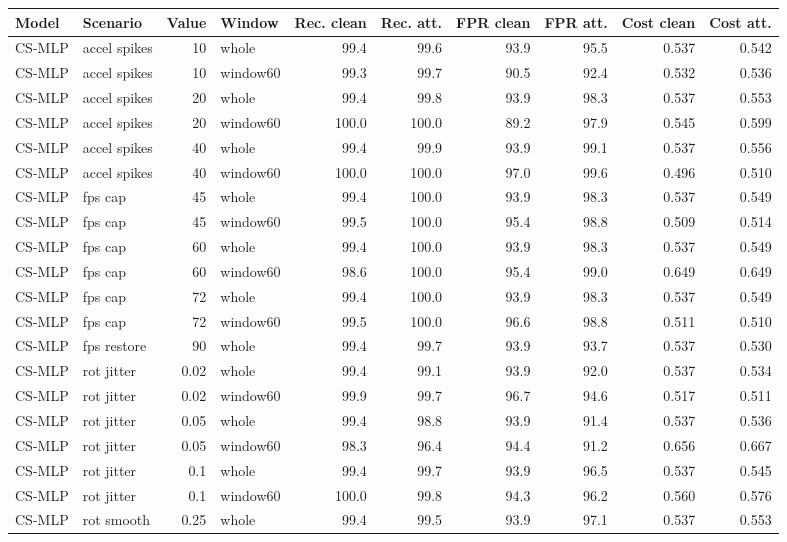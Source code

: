 \begin{longtable}{llrlrrrrrr}
\toprule
Model & Scenario & Value & Window & Rec. clean & Rec. att. & FPR clean & FPR att. & Cost clean & Cost att. \\
\midrule
\endhead
CS-MLP & accel spikes & 10 & whole & 99.4 & 99.6 & 93.9 & 95.5 & 0.537 & 0.542 \\
CS-MLP & accel spikes & 10 & window60 & 99.3 & 99.7 & 90.5 & 92.4 & 0.532 & 0.536 \\
CS-MLP & accel spikes & 20 & whole & 99.4 & 99.8 & 93.9 & 98.3 & 0.537 & 0.553 \\
CS-MLP & accel spikes & 20 & window60 & 100.0 & 100.0 & 89.2 & 97.9 & 0.545 & 0.599 \\
CS-MLP & accel spikes & 40 & whole & 99.4 & 99.9 & 93.9 & 99.1 & 0.537 & 0.556 \\
CS-MLP & accel spikes & 40 & window60 & 100.0 & 100.0 & 97.0 & 99.6 & 0.496 & 0.510 \\
CS-MLP & fps cap & 45 & whole & 99.4 & 100.0 & 93.9 & 98.3 & 0.537 & 0.549 \\
CS-MLP & fps cap & 45 & window60 & 99.5 & 100.0 & 95.4 & 98.8 & 0.509 & 0.514 \\
CS-MLP & fps cap & 60 & whole & 99.4 & 100.0 & 93.9 & 98.3 & 0.537 & 0.549 \\
CS-MLP & fps cap & 60 & window60 & 98.6 & 100.0 & 95.4 & 99.0 & 0.649 & 0.649 \\
CS-MLP & fps cap & 72 & whole & 99.4 & 100.0 & 93.9 & 98.3 & 0.537 & 0.549 \\
CS-MLP & fps cap & 72 & window60 & 99.5 & 100.0 & 96.6 & 98.8 & 0.511 & 0.510 \\
CS-MLP & fps restore & 90 & whole & 99.4 & 99.7 & 93.9 & 93.7 & 0.537 & 0.530 \\
CS-MLP & rot jitter & 0.02 & whole & 99.4 & 99.1 & 93.9 & 92.0 & 0.537 & 0.534 \\
CS-MLP & rot jitter & 0.02 & window60 & 99.9 & 99.7 & 96.7 & 94.6 & 0.517 & 0.511 \\
CS-MLP & rot jitter & 0.05 & whole & 99.4 & 98.8 & 93.9 & 91.4 & 0.537 & 0.536 \\
CS-MLP & rot jitter & 0.05 & window60 & 98.3 & 96.4 & 94.4 & 91.2 & 0.656 & 0.667 \\
CS-MLP & rot jitter & 0.1 & whole & 99.4 & 99.7 & 93.9 & 96.5 & 0.537 & 0.545 \\
CS-MLP & rot jitter & 0.1 & window60 & 100.0 & 99.8 & 94.3 & 96.2 & 0.560 & 0.576 \\
CS-MLP & rot smooth & 0.25 & whole & 99.4 & 99.5 & 93.9 & 97.1 & 0.537 & 0.553 \\

\end{longtable}
